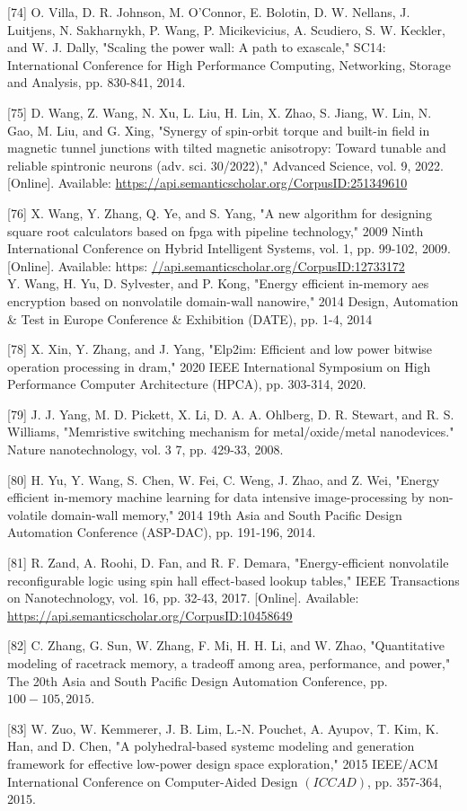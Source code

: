 \documentclass[10pt]{article}
\begin{document}
[74] O. Villa, D. R. Johnson, M. O'Connor, E. Bolotin, D. W. Nellans, J. Luitjens, N. Sakharnykh, P. Wang, P. Micikevicius, A. Scudiero, S. W. Keckler, and W. J. Dally, "Scaling the power wall: A path to exascale," SC14: International Conference for High Performance Computing, Networking, Storage and Analysis, pp. 830-841, 2014.

[75] D. Wang, Z. Wang, N. Xu, L. Liu, H. Lin, X. Zhao, S. Jiang, W. Lin, N. Gao, M. Liu, and G. Xing, "Synergy of spin-orbit torque and built-in field in magnetic tunnel junctions with tilted magnetic anisotropy: Toward tunable and reliable spintronic neurons (adv. sci. 30/2022)," Advanced Science, vol. 9, 2022. [Online]. Available: \href{https://api.semanticscholar.org/CorpusID:251349610}{https://api.semanticscholar.org/CorpusID:251349610}

[76] X. Wang, Y. Zhang, Q. Ye, and S. Yang, "A new algorithm for designing square root calculators based on fpga with pipeline technology," 2009 Ninth International Conference on Hybrid Intelligent Systems, vol. 1, pp. 99-102, 2009. [Online]. Available: https: \href{//api.semanticscholar.org/CorpusID:12733172}{//api.semanticscholar.org/CorpusID:12733172}\\
[77] Y. Wang, H. Yu, D. Sylvester, and P. Kong, "Energy efficient in-memory aes encryption based on nonvolatile domain-wall nanowire," 2014 Design, Automation \& Test in Europe Conference \& Exhibition (DATE), pp. 1-4, 2014

[78] X. Xin, Y. Zhang, and J. Yang, "Elp2im: Efficient and low power bitwise operation processing in dram," 2020 IEEE International Symposium on High Performance Computer Architecture (HPCA), pp. 303-314, 2020.

[79] J. J. Yang, M. D. Pickett, X. Li, D. A. A. Ohlberg, D. R. Stewart, and R. S. Williams, "Memristive switching mechanism for metal/oxide/metal nanodevices." Nature nanotechnology, vol. 3 7, pp. 429-33, 2008.

[80] H. Yu, Y. Wang, S. Chen, W. Fei, C. Weng, J. Zhao, and Z. Wei, "Energy efficient in-memory machine learning for data intensive image-processing by non-volatile domain-wall memory," 2014 19th Asia and South Pacific Design Automation Conference (ASP-DAC), pp. 191-196, 2014.

[81] R. Zand, A. Roohi, D. Fan, and R. F. Demara, "Energy-efficient nonvolatile reconfigurable logic using spin hall effect-based lookup tables," IEEE Transactions on Nanotechnology, vol. 16, pp. 32-43, 2017. [Online]. Available: \href{https://api.semanticscholar.org/CorpusID:10458649}{https://api.semanticscholar.org/CorpusID:10458649}

[82] C. Zhang, G. Sun, W. Zhang, F. Mi, H. H. Li, and W. Zhao, "Quantitative modeling of racetrack memory, a tradeoff among area, performance, and power," The 20th Asia and South Pacific Design Automation Conference, pp. $100-105,2015$.

[83] W. Zuo, W. Kemmerer, J. B. Lim, L.-N. Pouchet, A. Ayupov, T. Kim, K. Han, and D. Chen, "A polyhedral-based systemc modeling and generation framework for effective low-power design space exploration," 2015 IEEE/ACM International Conference on Computer-Aided Design $(I C C A D)$, pp. 357-364, 2015.
\end{document}

